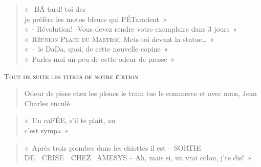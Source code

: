   \begin{verse}
    «~ {\Huge BÂ} tard!  toi des \\
    je préfère les motos bleues qui {\Huge PÉT}aradent~»\\
    «~- {\huge Révolution!} -Vous devez rendre votre exemplaire dans {\large 3} jours~»\\
    «~\textsc{Réunion Place du Martroi}; Mets-toi devant la statue…~»\\
    «~-- le DaDa, quoi, de cette nouvelle copine~»\\
    «~Parles moi un peu de cette odeur de presse~»
  \end{verse}

  \begin{center}
  \end{center}
  \begin{center}
    \textsc{Tout de suite les titres de notre édition}\\
  \end{center}
  \begin{quote}
    \textmusicalnote{} Odeur de pisse chez les ploucs \textmusicalnote{} le tram
    tue le commerce et avec nous, Jean Charles enculé
  \end{quote}
  \begin{center}
  \end{center}

  \begin{verse}
    «~Un ca{\Large FÉE}, s’il te plait, au \\
    c’est sympa~»
  \end{verse}
  \begin{verse}
    «~Après trois plombes dans les chiottes il est -- \textsc{SORTIE}\\
    \textsc{DE~ CRISE~ CHEZ~ AMESYS} -- Ah, mais si, un vrai colon, j’te dis!~»
  \end{verse}

